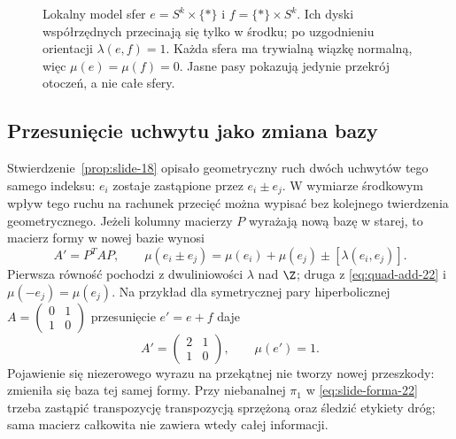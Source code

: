 \begin{figure}[htbp]
\centering
{}
\caption{Lokalny model sfer
$e=S^k\times\{*\}$ i $f=\{*\}\times S^k$.
Ich dyski współrzędnych przecinają się
tylko w środku; po uzgodnieniu orientacji
$\lambda(e,f)=1$. Każda sfera ma
trywialną wiązkę normalną, więc
$\mu(e)=\mu(f)=0$. Jasne pasy pokazują
jedynie przekrój otoczeń, a nie całe sfery.}
\label{fig:para-hiperboliczna-22}
\end{figure}

\subsection*{Przesunięcie uchwytu jako zmiana bazy}
Stwierdzenie~\ref{prop:slide-18} opisało geometryczny
ruch dwóch uchwytów tego samego indeksu:
$e_i$ zostaje zastąpione przez $e_i\pm e_j$.
W wymiarze środkowym wpływ tego ruchu na
rachunek przecięć można wypisać bez kolejnego
twierdzenia geometrycznego. Jeżeli kolumny
macierzy $P$ wyrażają nową bazę w starej,
to macierz formy w nowej bazie wynosi
\begin{equation}\label{eq:slide-forma-22}
 A'=P^{T}AP,\qquad
 \mu(e_i\pm e_j)
   =\mu(e_i)+\mu(e_j)
      \pm[\lambda(e_i,e_j)].
\end{equation}
Pierwsza równość pochodzi z dwuliniowości
$\lambda$ nad $\Z$; druga z
\eqref{eq:quad-add-22} i
$\mu(-e_j)=\mu(e_j)$.
Na przykład dla symetrycznej pary hiperbolicznej
$A=\left(\begin{smallmatrix}0&1\\1&0\end{smallmatrix}\right)$
przesunięcie $e'=e+f$ daje
\[
 A'=\begin{pmatrix}2&1\\1&0\end{pmatrix},
 \qquad \mu(e')=1.
\]
Pojawienie się niezerowego wyrazu na przekątnej
nie tworzy nowej przeszkody: zmieniła się baza
tej samej formy. Przy niebanalnej $\pi_1$ w
\eqref{eq:slide-forma-22} trzeba zastąpić
transpozycję transpozycją sprzężoną oraz
śledzić etykiety dróg; sama macierz całkowita
nie zawiera wtedy całej informacji.

